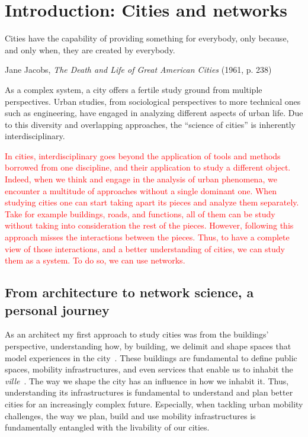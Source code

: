 \chapter{Introduction: Cities and networks}

\epigraph{Cities have the capability of providing something for everybody, only because, and only when, they are created by everybody.}{Jane Jacobs, \textit{The Death and Life of Great American Cities} (1961, p. 238)}

As a complex system, a city offers a fertile study ground from multiple perspectives. Urban studies, from sociological perspectives to more technical ones such as engineering, have engaged in analyzing different aspects of urban life. Due to this diversity and overlapping approaches, the ``science of cities'' is inherently interdisciplinary.

\textcolor{red}{In cities, interdisciplinary goes beyond the application of tools and methods borrowed from one discipline, and their application to study a different object. Indeed, when we think and engage in the analysis of urban phenomena, we encounter a multitude of approaches without a single dominant one. When studying cities one can start taking apart its pieces and analyze them separately. Take for example buildings, roads, and functions, all of them can be study without taking into consideration the rest of the pieces. However, following this approach misses the interactions between the pieces. Thus, to have a complete view of those interactions, and a better understanding of cities, we can study them as a system. To do so, we can use networks.}

\section{From architecture to network science, a personal journey}

As an architect my first approach to study cities was from the buildings' perspective, understanding how, by building, we delimit and shape spaces that model experiences in the city~\cite{gehl1971life}. These buildings are fundamental to define public spaces, mobility infrastructures, and even services that enable us to inhabit the \textit{ville}~\cite{sennett2018building}. The way we shape the city has an influence in how we inhabit it. Thus, understanding its infrastructures is fundamental to understand and plan better cities for an increasingly complex future. Especially, when tackling urban mobility challenges, the way we plan, build and use mobility infrastructures is fundamentally entangled with the livability of our cities.

